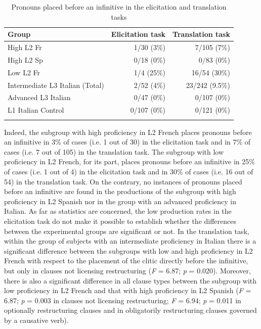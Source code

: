 \documentclass[output=paper,modfonts,nonflat,newtxmath]{langsci/langscibook}
\begin{document}
\begin{table}
\caption{\label{tab:sciutti:6} Pronouns placed before an infinitive in the elicitation and translation tasks}
\begin{tabularx}{0.8\textwidth}{Xrr}
\lsptoprule
Group & Elicitation task & Translation task\\
\midrule
High L2 Fr & 1/30 (3\%) & 7/105 (7\%)\\
High L2 Sp & 0/18 (0\%) & 0/83 (0\%)\\
Low L2 Fr & 1/4 (25\%) & 16/54 (30\%)\\
Intermediate L3 Italian (Total) & 2/52 (4\%) & 23/242 (9.5\%)\\
Advanced L3 Italian & 0/47 (0\%) & 0/107 (0\%)\\
L1 Italian Control & 0/107 (0\%) & 0/121 (0\%)\\
\lspbottomrule
\end{tabularx}
\end{table}

Indeed, the subgroup with high proficiency in L2 French places pronouns before an infinitive in 3\% of cases (i.e. 1 out of 30) in the elicitation task and in 7\% of cases (i.e. 7 out of 105) in the translation task. The subgroup with low proficiency in L2 French, for its part, places pronouns before an infinitive in 25\% of cases (i.e. 1 out of 4) in the elicitation task and in 30\% of cases (i.e. 16 out of 54) in the translation task. On the contrary, no instances of pronouns placed before an infinitive are found in the productions of the subgroup with high proficiency in L2 Spanish nor in the group with an advanced proficiency in Italian. As far as statistics are concerned, the low production rates in the elicitation task do not make it possible to establish whether the differences between the experimental groups are significant or not. In the translation task, within the group of subjects with an intermediate proficiency in Italian there is a significant difference between the subgroups with low and high proficiency in L2 French with respect to the placement of the clitic directly before the infinitive, but only in clauses not licensing restructuring (\textit{F} = 6.87; \textit{p} = 0.020). Moreover, there is also a significant difference in all clause types between the subgroup with low proficiency in L2 French and that with high proficiency in L2 Spanish (\textit{F} = 6.87; \textit{p} = 0.003 in clauses not licensing restructuring; \textit{F} = 6.94; \textit{p} = 0.011 in optionally restructuring clauses and in obligatorily restructuring clauses governed by a causative verb).
\end{document}
